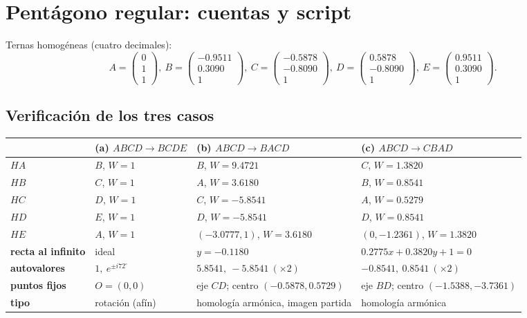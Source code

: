 \section{Pentágono regular: cuentas y script}\label{cap:18}\label{ap:pentagono}

Ternas homogéneas (cuatro decimales):
\[
A=\begin{pmatrix}0\\1\\1\end{pmatrix},\
B=\begin{pmatrix}-0.9511\\0.3090\\1\end{pmatrix},\
C=\begin{pmatrix}-0.5878\\-0.8090\\1\end{pmatrix},\
D=\begin{pmatrix}0.5878\\-0.8090\\1\end{pmatrix},\
E=\begin{pmatrix}0.9511\\0.3090\\1\end{pmatrix}.
\]

\subsection{Verificación de los tres casos}
\begin{center}\small
\begin{tabularx}{\textwidth}{>{\bfseries}l X X X}
\toprule
& (a) \(ABCD\to BCDE\) & (b) \(ABCD\to BACD\) & (c) \(ABCD\to CBAD\)\\
\midrule
\(HA\) & \(B\), \(W=1\) & \(B\), \(W=9.4721\) & \(C\), \(W=1.3820\)\\
\(HB\) & \(C\), \(W=1\) & \(A\), \(W=3.6180\) & \(B\), \(W=0.8541\)\\
\(HC\) & \(D\), \(W=1\) & \(C\), \(W=-5.8541\) & \(A\), \(W=0.5279\)\\
\(HD\) & \(E\), \(W=1\) & \(D\), \(W=-5.8541\) & \(D\), \(W=0.8541\)\\
\(HE\) & \(A\), \(W=1\) & \((-3.0777,1)\), \(W=3.6180\) & \((0,-1.2361)\), \(W=1.3820\)\\
recta al infinito & ideal & \(y=-0.1180\) & \(0.2775x+0.3820y+1=0\)\\
autovalores & \(1,\ e^{\pm i72^\circ}\) & \(5.8541,\ -5.8541\ (\times2)\) &
\(-0.8541,\ 0.8541\ (\times2)\)\\
puntos fijos & \(O=(0,0)\) & eje \(CD\); centro \((-0.5878,0.5729)\) &
eje \(BD\); centro \((-1.5388,-3.7361)\)\\
tipo & rotación (afín) & homología armónica, imagen partida & homología armónica\\
\bottomrule
\end{tabularx}
\end{center}


